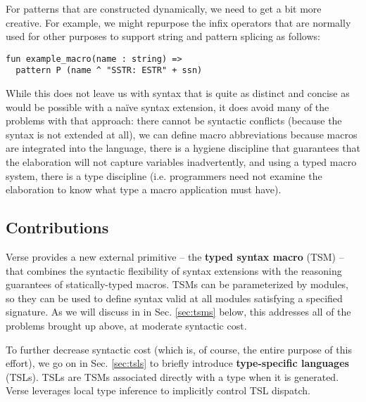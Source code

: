 For patterns that are constructed dynamically, we need to get a bit more creative. For example, we might repurpose the infix operators that are normally used for other purposes to support string and pattern splicing as follows:

\begin{lstlisting}[numbers=none,escapechar=|]
fun example_macro(name : string) => 
  pattern P (name ^ "SSTR: ESTR" + ssn)
\end{lstlisting}

While this does not leave us with syntax that is quite as distinct and concise as would be possible with a  na\"ive syntax extension,  it does avoid many of the problems with that approach: there cannot be syntactic conflicts (because the syntax is not extended at all), we can define macro abbreviations because macros are integrated into the language, there is a hygiene discipline that guarantees that the elaboration will not capture variables inadvertently, and using a typed macro system, there is a type discipline (i.e. programmers need not examine the elaboration to know what type a macro application must have). 


\subsection{Contributions}\label{sec:syntax-contributions}
Verse provides a new external primitive -- the \textbf{typed syntax macro} (TSM) -- that combines the syntactic flexibility of syntax extensions with the reasoning guarantees of statically-typed macros. TSMs can be parameterized by modules, so they can be used to define syntax valid at all modules satisfying a specified signature. As we will discuss in in Sec. \ref{sec:tsms} below, this addresses all of the problems brought up above, at moderate syntactic cost.

To further decrease syntactic cost (which is, of course, the entire purpose of this effort), we go on in Sec. \ref{sec:tsls} to briefly introduce \textbf{type-specific languages} (TSLs). TSLs are TSMs associated directly with a type when it is generated. Verse leverages local type inference to implicitly control TSL dispatch.

